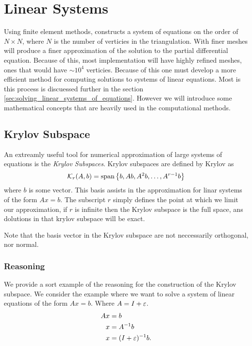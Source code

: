 \documentclass[../fem.tex]{subfile}
\begin{document}
\section{Linear Systems}%
\label{sec:linear_systems}

Using finite element methods, constructs a system of equations on the order of
$N\times N$, where $N$ is the number of verticies in the triangulation. With
finer meshes will produce a finer approximation of the solution to the partial
differential equation. Because of this, most implementation will have highly
refined meshes, ones that would have $\sim 10^4$ verticies. Because of this one
must develop a more efficient method for computing solutions to systems of
linear equations. Most is this process is discuessed further in the
section \ref{sec:solving_linear_systems_of_equations}. However we will
introduce some mathematical
concepts that are heavily used in the computational methods.

\subsection{Krylov Subspace}%
\label{sub:krylov_subspace}

An extreamly useful tool for numerical approximation of large systems of
equations is the \textit{Krylov Subspaces}. Krylov subspaces are defined by
Krylov \cite{KRYLOV} as
\begin{align*}
  \mathcal{K}_r(A,b)=\text{span}\left\{b,Ab,A^2b,\ldots,A^{r-1}b\right\}
\end{align*}
where $b$ is some vector. This basis assists in the approximation for linar
systems of the form $Ax=b$. The subscript $r$ simply defines the point at which
we limit our approximation, if $r$ is infinite then the Krylov subspace is the
full space, ans dolutions in that krylov subspace will be exact.

Note that the basis vector in the Krylov subspace are not neccessarily
orthogonal, nor normal.

\subsubsection{Reasoning}%
\label{ssub:reasoning}

We provide a sort example of the reasoning for the construction of the Krylov
subspace. We consider the example where we want to solve a system of linear
equations of the form $Ax=b$. Where $A=I+{\varepsilon}$.
\begin{align*}
  Ax&=b\\
  x&=A^{-1}b\\
  x&=(I+{\varepsilon})^{-1}b.
\end{align*}
\end{document}
